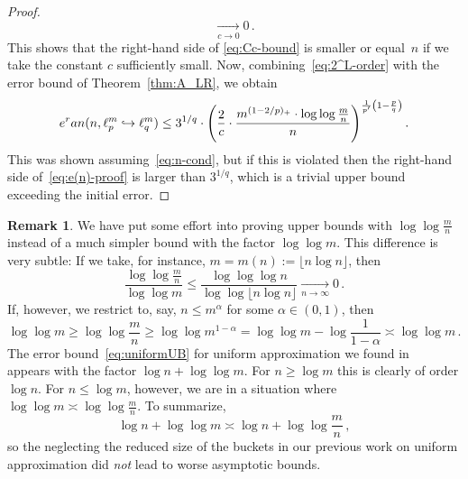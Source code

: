 \documentclass[12pt]{article}
\theoremstyle{plain}
\theoremstyle{definition}
\newtheorem{remark}[theorem]{Remark}
\newcommand{\ran}{\textup{ran}}
\newcommand{\embed}{\hookrightarrow}
\begin{document}
\begin{proof}
\begin{equation*}
            \xrightarrow[c \to 0]{} 0 \, .
    \end{equation*}
    This shows that the right-hand side of \eqref{eq:Cc-bound} is smaller or equal~$n$ if we take the constant $c$ sufficiently small.
    Now, combining~\eqref{eq:2^L-order} with the error bound of Theorem~\ref{thm:A_LR}, we obtain
    \begin{equation} \label{eq:e(n)-proof}
        e^\ran(n,\ell_p^m \embed \ell_q^m)
            \leq 3^{1/q} \cdot \left(\frac{2}{c} \cdot \frac{m^{(1-2/p)_+} \cdot \log \log \frac{m}{n}}{n}\right)^{\frac{1}{p'}\left(1 - \frac{p}{q}\right)} .
    \end{equation}
    This was shown assuming~\eqref{eq:n-cond},
    but if this is violated then the right-hand side of~\eqref{eq:e(n)-proof}
    is larger than $3^{1/q}$, which is a trivial upper bound exceeding the initial error.
\end{proof}

\begin{remark}
    We have put some effort into proving upper bounds with $\log \log \frac{m}{n}$ instead of a much simpler bound with the factor $\log \log m$.
    This difference is very subtle: If we take, for instance, $m = m(n) := \lfloor n \log n \rfloor$,
    then
    \begin{equation*}
        \frac{\log \log \frac{m}{n}}{\log \log m}
            \leq \frac{\log \log \log n}{\log \log \lfloor n \log n \rfloor}
            \xrightarrow[n \to \infty]{} 0 \,.
    \end{equation*}
    If, however, we restrict to, say, $n \leq m^\alpha$ for some $\alpha \in (0,1)$, then
    \begin{equation*}
        \log \log m
            \geq \log \log \textstyle\frac{m}{n}
            \geq \log \log m^{1-\alpha}
            = \log \log m - \log \frac{1}{1-\alpha}
            \asymp \log \log m \,.
    \end{equation*}
    The error bound~\eqref{eq:uniformUB} for uniform approximation we found in~\cite{KW24b}
    appears with the factor $\log n + \log \log m$.
    For $n \geq \log m$ this is clearly of order $\log n$.
    For $n \leq \log m$, however, we are in a situation where $\log \log m \asymp \log \log \frac{m}{n}$.
    To summarize,
    \begin{equation*}
        \log n + \log \log m \asymp \log n + \log \log \textstyle\frac{m}{n} \,,
    \end{equation*}
    so the neglecting the reduced size of the buckets in our previous work on uniform approximation
    did \emph{not} lead to worse asymptotic bounds.
\end{remark}
\end{document}
